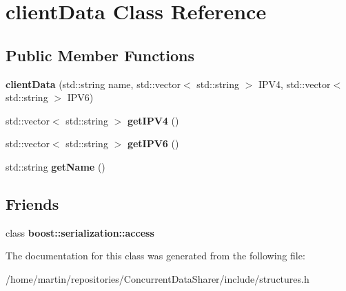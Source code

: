 \hypertarget{classclientData}{}\section{client\+Data Class Reference}
\label{classclientData}
\subsection*{Public Member Functions}
\begin{DoxyCompactItemize}
\item 
{\bfseries client\+Data} (std\+::string name, std\+::vector$<$ std\+::string $>$ I\+P\+V4, std\+::vector$<$ std\+::string $>$ I\+P\+V6)\hypertarget{classclientData_a975c4515ddc744bc5efa71b6aec38010}{}\label{classclientData_a975c4515ddc744bc5efa71b6aec38010}

\item 
std\+::vector$<$ std\+::string $>$ {\bfseries get\+I\+P\+V4} ()\hypertarget{classclientData_a2f69be4b2b86af0484c0b9111ebc2be0}{}\label{classclientData_a2f69be4b2b86af0484c0b9111ebc2be0}

\item 
std\+::vector$<$ std\+::string $>$ {\bfseries get\+I\+P\+V6} ()\hypertarget{classclientData_a8f9d41274440ddfefbcb450aba9c28d2}{}\label{classclientData_a8f9d41274440ddfefbcb450aba9c28d2}

\item 
std\+::string {\bfseries get\+Name} ()\hypertarget{classclientData_abddedee74c8918168048670cf4104b55}{}\label{classclientData_abddedee74c8918168048670cf4104b55}

\end{DoxyCompactItemize}
\subsection*{Friends}
\begin{DoxyCompactItemize}
\item 
class {\bfseries boost\+::serialization\+::access}\hypertarget{classclientData_ac98d07dd8f7b70e16ccb9a01abf56b9c}{}\label{classclientData_ac98d07dd8f7b70e16ccb9a01abf56b9c}

\end{DoxyCompactItemize}


The documentation for this class was generated from the following file\+:\begin{DoxyCompactItemize}
\item 
/home/martin/repositories/\+Concurrent\+Data\+Sharer/include/structures.\+h\end{DoxyCompactItemize}
